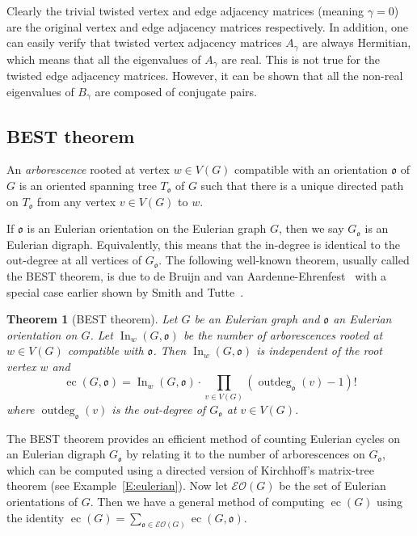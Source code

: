 \documentclass[11pt]{amsart}
\theoremstyle{plain}
\newtheorem{theorem}{Theorem}[section]
\theoremstyle{definition}
\newcommand{\mfrako}{{\mathfrak o}}
\DeclareMathOperator{\ec}{\operatorname{ec}}
\DeclareMathOperator{\outdeg}{\operatorname{outdeg}}
\DeclareMathOperator{\In}{\operatorname{In}}
\numberwithin{equation}{section}
\begin{document}
Clearly the trivial twisted vertex and edge adjacency matrices  (meaning $\gamma=0$) are the original vertex and edge adjacency matrices respectively. In addition, one can easily verify that twisted vertex adjacency matrices $A_\gamma$ are always Hermitian, which means that all the eigenvalues of $A_\gamma$ are real. This is not true for the twisted edge adjacency matrices. However, it can be shown that all the non-real eigenvalues of $B_\gamma$ are composed of conjugate pairs. 

\subsection{BEST theorem} 
An \emph{arborescence} rooted at vertex $w\in V(G)$ compatible with an orientation $\mfrako$ of $G$ is an oriented spanning tree $T_\mfrako$ of $G$ such that there is a unique directed path on $T_\mfrako$ from any vertex $v\in V(G)$ to $w$. 

If $\mfrako$ is an Eulerian orientation on the Eulerian graph $G$, then we say $G_\mfrako$ is an Eulerian digraph. Equivalently, this means that the in-degree is identical to the out-degree at all vertices of  $G_\mfrako$. The following well-known theorem, usually called the BEST theorem, is due to de Bruijn and van Aardenne-Ehrenfest~\cite{AB1951circuits} with a special case earlier shown by Smith and Tutte~\cite{ST1941unicursal}. 

\begin{theorem}[BEST theorem]\label{T:best}
Let $G$ be an Eulerian graph and $\mfrako$ an Eulerian orientation on $G$. Let $\In_w(G,\mfrako)$ be the number of arborescences rooted at $w\in V(G)$ compatible with $\mfrako$. Then $\In_w(G,\mfrako)$ is independent of the root vertex $w$ and 
$$\ec(G,\mfrako)=\In_w(G,\mfrako)\cdot \prod_{v\in V(G)}(\outdeg_\mfrako(v)-1)!$$ 
where $\outdeg_\mfrako(v)$ is the out-degree of $G_\mfrako$ at $v\in V(G)$. 
\end{theorem}

The BEST theorem provides an efficient method of counting Eulerian cycles on an Eulerian digraph $G_\mfrako$ by relating it to the number of arborescences on $G_\mfrako$, which can be computed using a directed version of Kirchhoff's matrix-tree theorem (see Example~\ref{E:eulerian}). Now let $\mathcal{EO}(G)$ be the set of Eulerian orientations of $G$. Then we have a general method of computing $\ec(G)$  using the identity $\ec(G)=\sum_{\mfrako\in \mathcal{EO}(G)}\ec(G,\mfrako)$. 
\end{document}
